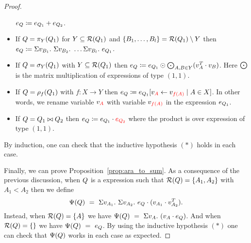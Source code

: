 \begin{proof}
\begin{itemize}
	$e_{Q}\coloneqq e_{Q_1} + e_{Q_2}$.
	\item If $Q=\pi_{Y}(Q_1)$ for $Y\subseteq \mathcal{R}(Q_1)$ and $\{B_1, \ldots, B_l\} = \mathcal{R}(Q_1) \setminus Y$ then
	$
	e_{Q}\coloneqq  \Sigma v_{B_1}. \ \Sigma v_{B_2}. \ \ldots \Sigma v_{B_l}. \ e_{Q_1}
	$.
	\item If $Q=\sigma_{Y}(Q_1)$ with $Y\subseteq\mathcal{R}(Q_1)$ then
	$
	e_{Q}\coloneqq e_{Q_1} \odot \bigodot_{A,B\in Y} (v_{A}^T \cdot v_{B})
	$.
	Here $\bigodot$ is the matrix multiplication of expressions of type $(1,1)$.
	\item If $Q=\rho_{f}(Q_1)$ with $f: X \rightarrow Y$ then
	$e_{Q}\coloneqq e_{Q_1}[v_{{\color{red} A}} \gets v_{{\color{red} f(A)}}\mid A\in X]$.
	In other words, we rename variable $v_{{\color{red} A}}$ with variable $v_{{\color{red} f(A)}}$ in the expression $e_{Q_1}$. 
	\item If $Q=Q_1\bowtie Q_2$ then
	$e_{Q}\coloneqq e_{Q_1} \cdot {\color{red} e_{Q_2}}$ where the product is over expression of type $(1,1)$.
\end{itemize}
By induction, one can check that the inductive hypothesis $(*)$ holds in each case. 

Finally, we can prove Proposition~\ref{prop:ara_to_sum}.
As a consequence of the previous discussion, when $Q$ is a \rak expression 
such that $\mathcal{R}(Q)=\{A_1,A_2\}$ with $A_1<A_2$ then we define
$$
\Psi(Q) \ = \ \Sigma v_{A_1}. \ \Sigma v_{A_2}. \ e_{Q} \cdot (v_{A_1} \cdot v_{A_2}^T). 
$$
Instead, when $\mathcal{R}(Q)=\{A\}$ we have $
\Psi(Q) \ = \ \Sigma v_{A}. \  (v_{A} \cdot e_{Q})$.
And when $\mathcal{R}(Q)=\{\}$ we have $
\Psi(Q) \ = \ e_{Q}
$.
By using the inductive hypothesis $(*)$ one can check that $\Psi(Q)$ works in each case as expected. 
\end{proof}
 